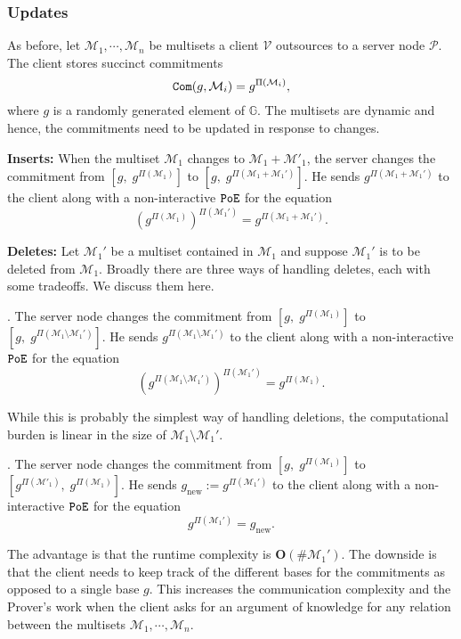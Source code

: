 \documentclass[11pt, lettersize, notitlepage, leqno, footskip=0.6cm]{article}
\newcommand{\ttt}{\texttt}
\newcommand{\bG}{\mathbb{G}}
\newcommand{\pr}{\protect}
\newcommand{\mc}{\mathcal}
\newcommand{\mbf}{\mathbf}
\newcommand{\mr}{\mathrm}
\newcommand{\sm}{\setminus}
\newcommand{\mP}{\mc{P}}
\newcommand{\V}{\mc{V}}
\newcommand{\vs}{\vspace{-0.15cm}}
\newcommand{\noin}{\noindent}
\numberwithin{equation}{section}
\begin{document}
\subsubsection{\fontsize{11}{11} Updates}

As before, let $\mc{M}_1,\cdots, \mc{M}_n$ be multisets a client $\V$ outsources to a server node $\mP$. The client stores succinct commitments \vs $$\pr{\ttt{Com}}(g, \mc{M}_i) = g^{\Pi(\mc{M}_i)},$$ where $g$ is a randomly generated element of $\bG$. The multisets are dynamic and hence, the commitments need to be updated in response to changes. \vspace{0.15cm}

\noin \textbf{Inserts:} When the multiset $\mc{M}_1$ changes to $\mc{M}_1+\mc{M}'_1$, the server changes the commitment from $[g,\; g^{\Pi(\mc{M}_1)}]$ to $[g,\;g^{\Pi(\mc{M}_1+\mc{M}_1')}]$. He sends $g^{\Pi(\mc{M}_1+\mc{M}_1')}$ to the client along with a non-interactive $\tt{PoE}$ for the equation \vs $$(g^{\Pi(\mc{M}_1)})^{\Pi(\mc{M}_1')} =   g^{\Pi(\mc{M}_1+\mc{M}_1')}.$$  

\noin \textbf{Deletes:} Let $\mc{M}_1'$ be a multiset contained in $\mc{M}_1$ and suppose $\mc{M}_1'$ is to be deleted from $\mc{M}_1$. Broadly there are three ways of handling deletes, each with some tradeoffs. We discuss them here. \vspace{0.1cm}

\noin 1. The server node changes the commitment from $[g,\; g^{\Pi(\mc{M}_1)}]$ to $[g,\;g^{\Pi(\mc{M}_1\sm\mc{M}_1')}]$. He sends $g^{\Pi(\mc{M}_1\sm\mc{M}_1')}$ to the client along with a non-interactive $\tt{PoE}$ for the equation \vs $$(g^{\Pi(\mc{M}_1\sm\mc{M}_1')})^{\Pi(\mc{M}_1')} =   g^{\Pi(\mc{M}_1)}.$$

While this is probably the simplest way of handling deletions, the computational burden is linear in the size of $\mc{M}_1\sm\mc{M}_1'$.
\vspace{0.1cm}

\noin 2. The server node changes the commitment from $[g,\; g^{\Pi(\mc{M}_1)}]$ to $[g^{\Pi(\mc{M}'_1)},\; g^{\Pi(\mc{M}_1)}]$. He sends $g_{\mr{new}}:= g^{\Pi(\mc{M}_1')}$ to the client along with a non-interactive $\tt{PoE}$ for the equation \vs $$g^{\Pi(\mc{M}_1')} =   g_{\mr{new}}.$$

The advantage is that the runtime complexity is $\mbf{O}(\#\mc{M}_1')$. The downside is that the client needs to keep track of the different bases for the commitments as opposed to a single base $g$. This increases the communication complexity and the Prover's work when the client asks for an argument of knowledge for any relation between the multisets $\mc{M}_1,\cdots,\mc{M}_n$. 
\end{document}
